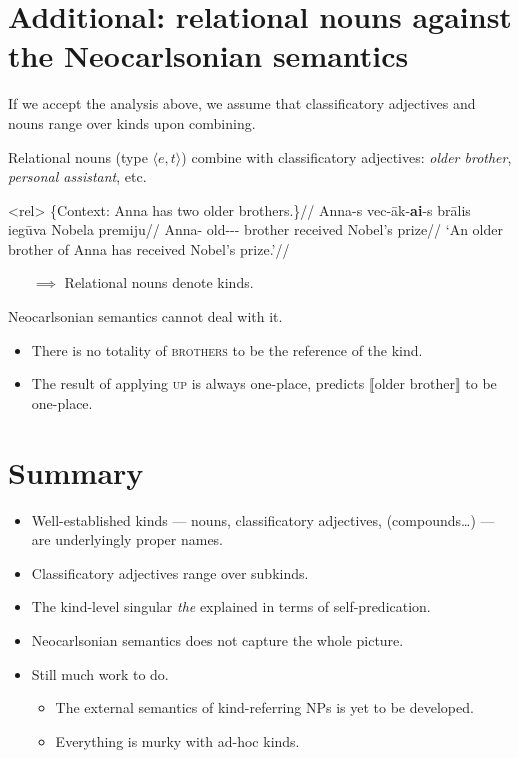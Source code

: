 \documentclass[a4paper,12pt]{article}
\begin{document}
\section{Additional: relational nouns against the Neocarlsonian semantics}\label{rel}

If we accept the analysis above, we assume that classificatory adjectives and nouns range over kinds upon combining.

Relational nouns (type $\langle e,t\rangle$) combine with classificatory adjectives: \textit{older brother}, \textit{personal assistant}, etc.

\ex<rel>
    \begingl
        \glpreamble \{Context: Anna has two older brothers.\}//
        \gla Anna-s vec-āk-\textbf{ai}-s brālis iegūva Nobela premiju//
        \glb Anna-\Gen{} old-\Comp-\Def-\Nom{} brother received Nobel's prize//
        \glft `An older brother of Anna has received Nobel's prize.'//
    \endgl
\xe

\begin{itemize}
    \item[$\implies$] Relational nouns denote kinds.
\end{itemize}

Neocarlsonian semantics cannot deal with it.
\begin{itemize}
    \item There is no totality of \textsc{brothers} to be the reference of the kind.
    \item The result of applying \textsc{up} is always one-place, predicts $\llbracket \text{older brother}\rrbracket$ to be one-place.
\end{itemize}

\section{Summary}

\begin{itemize}
    \item Well-established kinds --- nouns, classificatory adjectives, (compounds\dots) --- are underlyingly proper names.
    \item Classificatory adjectives range over subkinds.
    \item The kind-level singular \textit{the} explained in terms of self-predication.
    \item Neocarlsonian semantics does not capture the whole picture.
    \item Still much work to do.
    \begin{itemize}
        \item The external semantics of kind-referring NPs is yet to be developed.
        \item Everything is murky with ad-hoc kinds.
    \end{itemize}
\end{itemize}

\printbibliography
\end{document}
